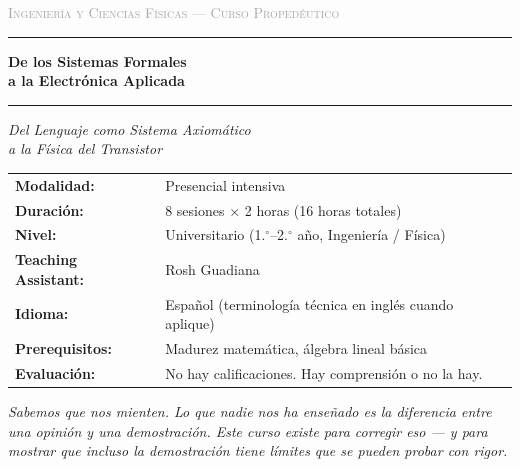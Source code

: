\documentclass[11pt, letterpaper]{article}
\begin{document}
\begin{titlepage}
\begin{center}

\vspace*{0.8cm}
{\footnotesize\textsc{\textcolor{darkgray}{Ingenier\'ia y Ciencias F\'isicas --- Curso Propedéutico}}}
\vspace{0.4cm}

\textcolor{mitred}{\rule{\linewidth}{1.2pt}}
\vspace{0.4cm}

{\LARGE\bfseries De los Sistemas Formales\\[0.3em] a la Electr\'onica Aplicada}

\vspace{0.3cm}
\textcolor{mitred}{\rule{\linewidth}{1.2pt}}
\vspace{0.6cm}

{\large\itshape Del Lenguaje como Sistema Axiom\'atico\\
a la F\'isica del Transistor}

\vspace{1.4cm}

\begin{tabular}{ll}
\textbf{Modalidad:}           & Presencial intensiva \\[3pt]
\textbf{Duraci\'on:}          & 8 sesiones $\times$ 2 horas (16 horas totales) \\[3pt]
\textbf{Nivel:}               & Universitario (1.$^\circ$--2.$^\circ$ a\~no, Ingenier\'ia / F\'isica) \\[3pt]
\textbf{Teaching Assistant:}  & Rosh Guadiana \\[3pt]
\textbf{Idioma:}              & Espa\~nol (terminolog\'ia t\'ecnica en ingl\'es cuando aplique) \\[3pt]
\textbf{Prerequisitos:}       & Madurez matem\'atica, \'algebra lineal b\'asica \\[3pt]
\textbf{Evaluaci\'on:}        & No hay calificaciones. Hay comprensi\'on o no la hay. \\
\end{tabular}

\vspace{1.6cm}

\begin{tcolorbox}[
  colback=mitred!4, colframe=mitred,
  boxrule=0.8pt, left=10pt, right=10pt, top=8pt, bottom=8pt]
{\small\itshape
Sabemos que nos mienten. Lo que nadie nos ha ense\~nado es la diferencia entre
una opini\'on y una demostraci\'on. Este curso existe para corregir eso
--- y para mostrar que incluso la demostraci\'on tiene l\'imites
que se pueden probar con rigor.

}
\end{tcolorbox}
\end{center}
\end{titlepage}
\end{document}
